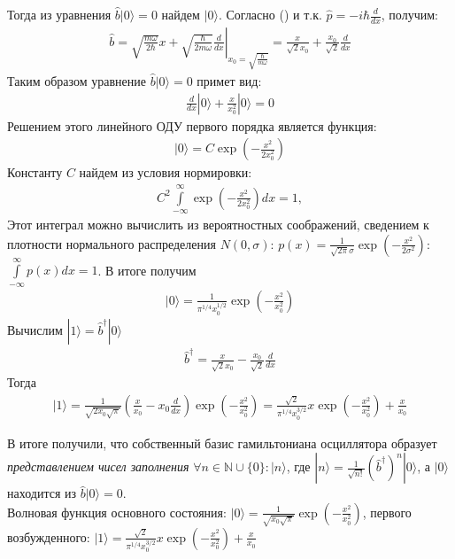 \documentclass[__main__.tex]{subfiles}
\begin{document}
	Тогда из уравнения $\hat{b}|0\rangle = 0$ найдем $|0\rangle$. Согласно () и т.к. $\hat{p}=-i\hbar\frac{d}{dx}$, получим:
	\begin{gather*}
		\hat{b}
		=
		\left.
		\sqrt{\frac{m\omega}{2\hbar}}x+\sqrt{\frac{\hbar}{2m\omega}}\frac{d}{dx}
		\right|_{x_0=\sqrt{\frac{\hbar}{m\omega}}}
		=
		\frac{x}{\sqrt{2}x_0}+\frac{x_0}{\sqrt{2}}\frac{d}{dx}
	\end{gather*}
	Таким образом уравнение $\hat{b}|0\rangle = 0$ примет вид:
	\begin{gather*}
		\frac{d}{dx}|0\rangle + \frac{x}{x_0^2}|0\rangle = 0
	\end{gather*}
	Решением этого линейного ОДУ первого порядка является функция:
	\begin{gather*}
		|0\rangle = C\exp\left(-\frac{x^2}{2x_0^2}\right)
	\end{gather*}
	Константу $C$ найдем из условия нормировки:
	\begin{gather*}
		C^2\int\limits_{-\infty}^{\infty}\exp\left(-\frac{x^2}{2x_0^2}\right)dx=1,
	\end{gather*}
	Этот интеграл можно вычислить из вероятностных соображений, сведением к плотности нормального распределения $N(0,\sigma)$: $p(x)=\frac{1}{\sqrt{2\pi}\sigma}\exp\left(-\frac{x^2}{2\sigma^2}\right)$: $\int\limits_{-\infty}^{\infty}p(x)dx=1$.
	В итоге получим
	\begin{gather*}
		|0\rangle = \frac{1}{\pi^{1/4}x_0^{1/2}}\exp\left(-\frac{x^2}{x_0^2}\right)
	\end{gather*}
	Вычислим $|1\rangle = \hat{b}^\dagger|0\rangle$
	\begin{gather*}
		\hat{b}^\dagger
		=
		\frac{x}{\sqrt{2}x_0}-\frac{x_0}{\sqrt{2}}\frac{d}{dx}
	\end{gather*}
	Тогда
	\begin{gather*}
		|1\rangle
		=
		\frac{1}{\sqrt{2x_0\sqrt{\pi}}}\left(\frac{x}{x_0}-x_0\frac{d}{dx}\right)\exp\left(-\frac{x^2}{x_0^2}\right)
		=
		\frac{\sqrt{2}}{\pi^{1/4}x_0^{3/2}}x\exp\left(-\frac{x^2}{x_0^2}\right) + \frac{x}{x_0}
	\end{gather*}
	
	В итоге получили, что собственный базис гамильтониана осциллятора образует \textit{представлением чисел заполнения} $\forall n\in\mathbb{N}\cup\{0\}\colon|n\rangle$, где $|n\rangle = \frac{1}{\sqrt{n!}}\left(\hat{b}^\dagger\right)^n|0\rangle$, а $|0\rangle$ находится из $\hat{b}|0\rangle = 0$.\\
	
	Волновая функция основного состояния: $|0\rangle = \frac{1}{\sqrt{x_0\sqrt{\pi}}}\exp\left(-\frac{x^2}{x_0^2}\right)$, первого возбужденного: $|1\rangle = \frac{\sqrt{2}}{\pi^{1/4}x_0^{3/2}}x\exp\left(-\frac{x^2}{x_0^2}\right) + \frac{x}{x_0}$
	
\end{document}
